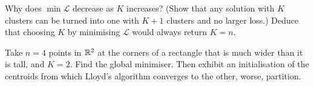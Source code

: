 \begin{exercise}[$\star$]
Why does $\min \mathcal{L}$ decrease as $K$ increases? (Show that any solution with $K$
clusters can be turned into one with $K+1$ clusters and no larger loss.) Deduce that
choosing $K$ by minimising $\mathcal{L}$ would always return $K = n$.
\end{exercise}

\begin{exercise}[$\star\star$]
Take $n = 4$ points in $\mathbb{R}^2$ at the corners of a rectangle that is much wider than it
is tall, and $K = 2$. Find the global minimiser. Then exhibit an initialisation of the
centroids from which Lloyd's algorithm converges to the other, worse, partition.
\end{exercise}


